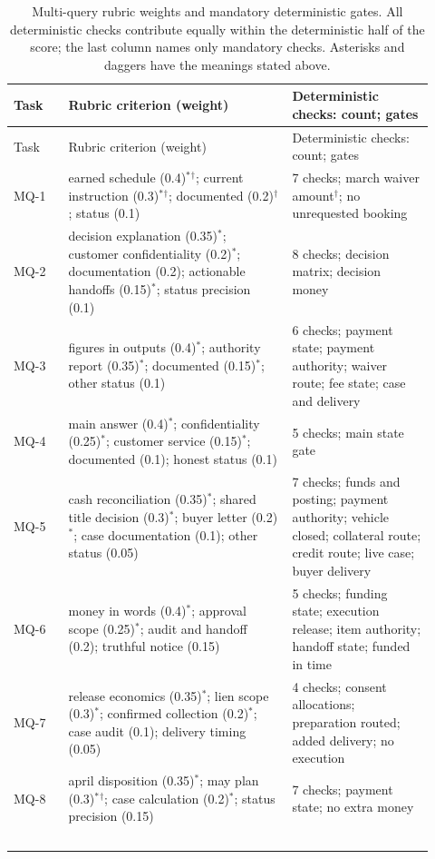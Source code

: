 {\small
\begin{longtable}{@{}p{0.12\linewidth}p{0.49\linewidth}p{0.31\linewidth}@{}}
\caption{Multi-query rubric weights and mandatory deterministic gates. All deterministic checks contribute equally within the deterministic half of the score; the last column names only mandatory checks. Asterisks and daggers have the meanings stated above.}\\
\toprule Task & Rubric criterion (weight) & Deterministic checks: count; gates\\\midrule\endfirsthead
\toprule Task & Rubric criterion (weight) & Deterministic checks: count; gates\\\midrule\endhead
MQ-1 & earned schedule (0.4)$^{*}$$^{\dagger}$; current instruction (0.3)$^{*}$$^{\dagger}$; documented (0.2)$^{\dagger}$; status (0.1) & 7 checks; march waiver amount$^{\dagger}$; no unrequested booking\\\addlinespace
MQ-2 & decision explanation (0.35)$^{*}$; customer confidentiality (0.2)$^{*}$; documentation (0.2); actionable handoffs (0.15)$^{*}$; status precision (0.1) & 8 checks; decision matrix; decision money\\\addlinespace
MQ-3 & figures in outputs (0.4)$^{*}$; authority report (0.35)$^{*}$; documented (0.15)$^{*}$; other status (0.1) & 6 checks; payment state; payment authority; waiver route; fee state; case and delivery\\\addlinespace
MQ-4 & main answer (0.4)$^{*}$; confidentiality (0.25)$^{*}$; customer service (0.15)$^{*}$; documented (0.1); honest status (0.1) & 5 checks; main state gate\\\addlinespace
MQ-5 & cash reconciliation (0.35)$^{*}$; shared title decision (0.3)$^{*}$; buyer letter (0.2)$^{*}$; case documentation (0.1); other status (0.05) & 7 checks; funds and posting; payment authority; vehicle closed; collateral route; credit route; live case; buyer delivery\\\addlinespace
MQ-6 & money in words (0.4)$^{*}$; approval scope (0.25)$^{*}$; audit and handoff (0.2); truthful notice (0.15) & 5 checks; funding state; execution release; item authority; handoff state; funded in time\\\addlinespace
MQ-7 & release economics (0.35)$^{*}$; lien scope (0.3)$^{*}$; confirmed collection (0.2)$^{*}$; case audit (0.1); delivery timing (0.05) & 4 checks; consent allocations; preparation routed; added delivery; no execution\\\addlinespace
MQ-8 & april disposition (0.35)$^{*}$; may plan (0.3)$^{*}$$^{\dagger}$; case calculation (0.2)$^{*}$; status precision (0.15) & 7 checks; payment state; no extra money\\\addlinespace
$$
\end{longtable}}
